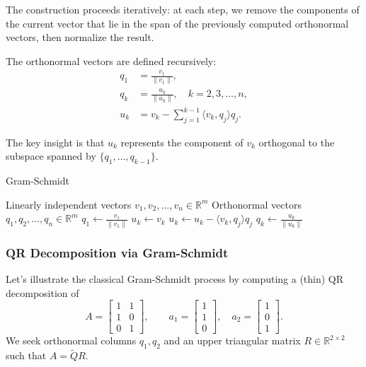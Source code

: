 \documentclass[../../main.tex]{subfiles}
\begin{document}
The construction proceeds iteratively: at each step, we remove the components of the current vector that lie in the span of the previously computed orthonormal vectors, then normalize the result.

The orthonormal vectors are defined recursively:
\begin{align}
    q_1 & = \frac{v_1}{\|v_1\|},                                 \\
    q_k & = \frac{u_k}{\|u_k\|}, \quad k = 2, 3, \ldots, n,      \\
    u_k & = v_k - \sum_{j=1}^{k-1} \langle v_k, q_j \rangle q_j.
\end{align}

The key insight is that $u_k$ represents the component of $v_k$ orthogonal to the subspace spanned by $\{q_1, \ldots, q_{k-1}\}$.

\begin{algorithm}[H]
    \caption{Gram-Schmidt}
    \begin{algorithmic}
        \Require Linearly independent vectors $v_1, v_2, \ldots, v_n \in \mathbb{R}^m$
        \Ensure Orthonormal vectors $q_1, q_2, \ldots, q_n \in \mathbb{R}^m$
        \State $q_1 \leftarrow \frac{v_1}{\|v_1\|}$
        \State $u_k \leftarrow v_k$
        \State $u_k \leftarrow u_k - \langle v_k, q_j \rangle q_j$ 
        \EndFor
        \State $q_k \leftarrow \frac{u_k}{\|u_k\|}$ 
        \EndFor
    \end{algorithmic}
\end{algorithm}

\subsubsection{QR Decomposition via Gram-Schmidt}
\label{sec:qr-gram-schmidt}
Let's illustrate the classical Gram-Schmidt process by computing a (thin) QR decomposition of
\[
    A = \begin{bmatrix} 1 & 1 \\ 1 & 0 \\ 0 & 1 \end{bmatrix},
    \qquad a_1 = \begin{bmatrix} 1 \\ 1 \\ 0 \end{bmatrix},\quad a_2 = \begin{bmatrix} 1 \\ 0 \\ 1 \end{bmatrix}.
\]
We seek orthonormal columns $q_1, q_2$ and an upper triangular matrix $R \in \mathbb{R}^{2 \times 2}$ such that $A = \widetilde{Q} R$.
\end{document}

